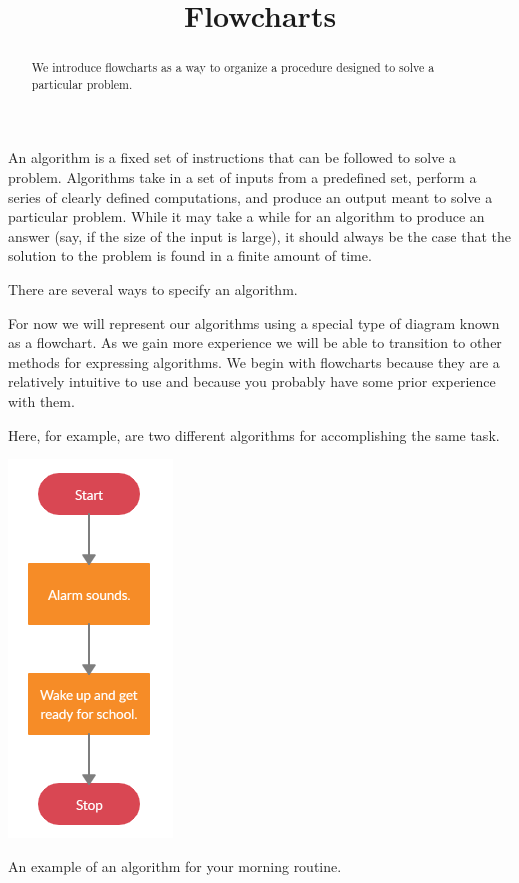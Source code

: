 \documentclass{ximera}
\title{Flowcharts}
\begin{document}
  
\begin{abstract}  
We introduce flowcharts as a way to organize a procedure designed to solve a particular problem.
\end{abstract}  
\maketitle

An algorithm is a fixed set of instructions that can be followed to solve a problem. Algorithms take in a set of inputs from a predefined set, perform a series of clearly defined computations, and produce an output meant to solve a particular problem. While it may take a while for an algorithm to produce an answer (say, if the size of the input is large), it should always be the case that the solution to the problem is found in a finite amount of time.

There are several ways to specify an algorithm. 

For now we will represent our algorithms using a special type of diagram known as a flowchart. As we gain more experience we will be able to transition to other methods for expressing algorithms. We begin with flowcharts because they are a relatively intuitive to use and because you probably have some prior experience with them.

Here, for example, are two different algorithms for accomplishing the same task. 

\begin{center}
	\includegraphics{morning1.png}
\end{center}
\begin{center}
	An example of an algorithm for your morning routine.
\end{center}
\end{document}
